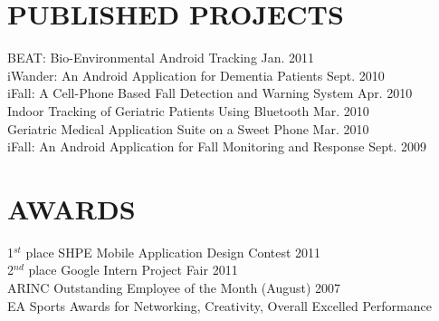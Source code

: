 \documentclass[margin]{res}
\begin{document}
\begin{resume}
\section {PUBLISHED PROJECTS}
BEAT: Bio-Environmental Android Tracking \hfill Jan. 2011\\
iWander: An Android Application for Dementia Patients \hfill Sept. 2010\\
iFall: A Cell-Phone Based Fall Detection and Warning System \hfill Apr. 2010\\
Indoor Tracking of Geriatric Patients Using Bluetooth \hfill Mar. 2010\\
Geriatric Medical Application Suite on a Sweet Phone \hfill Mar. 2010\\
iFall: An Android Application for Fall Monitoring and Response \hfill Sept. 2009





\section{AWARDS}
1$^{st}$ place SHPE Mobile Application  Design Contest \hfill 2011\\
2$^{nd}$ place Google Intern Project Fair \hfill 2011 \\
ARINC Outstanding Employee of the Month (August) \hfill 2007 \\
EA Sports Awards for Networking, Creativity, Overall Excelled Performance\\




\end{resume}
\end{document}
